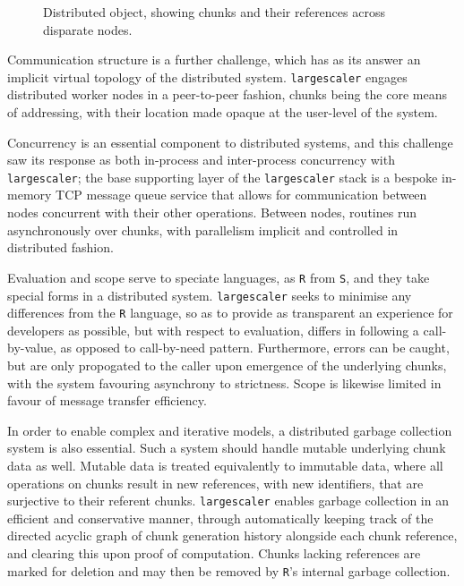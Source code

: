 \begin{figure}[ht]
\begin{center}

\caption{Distributed object, showing chunks and their references across disparate nodes.}
\label{fig:distobj}
\end{center}
\end{figure}

Communication structure is a further challenge, which has as its answer an implicit virtual topology of the distributed system.
\texttt{largescaler} engages distributed worker nodes in a peer-to-peer fashion, chunks being the core means of addressing, with their location made opaque at the user-level of the system.

Concurrency is an essential component to distributed systems, and this challenge saw its response as both in-process and inter-process concurrency with \texttt{largescaler}; the base supporting layer of the \texttt{largescaler} stack is a bespoke in-memory TCP message queue service that allows for communication between nodes concurrent with their other operations.
Between nodes, routines run asynchronously over chunks, with parallelism implicit and controlled in distributed fashion.

Evaluation and scope serve to speciate languages, as \texttt{R} from \texttt{S}, and they take special forms in a distributed system.
\texttt{largescaler} seeks to minimise any differences from the \texttt{R} language, so as to provide as transparent an experience for developers as possible, but with respect to evaluation, differs in following a call-by-value, as opposed to call-by-need pattern. Furthermore, errors can be caught, but are only propogated to the caller upon emergence of the underlying chunks, with the system favouring asynchrony to strictness. Scope is likewise limited in favour of message transfer efficiency.

In order to enable complex and iterative models, a distributed garbage collection system is also essential.
Such a system should handle mutable underlying chunk data as well.
Mutable data is treated equivalently to immutable data, where all operations on chunks result in new references, with new identifiers, that are surjective to their referent chunks.
\texttt{largescaler} enables garbage collection in an efficient and conservative manner, through automatically keeping track of the directed acyclic graph of chunk generation history alongside each chunk reference, and clearing this upon proof of computation.
Chunks lacking references are marked for deletion and may then be removed by \texttt{R}'s internal garbage collection.


